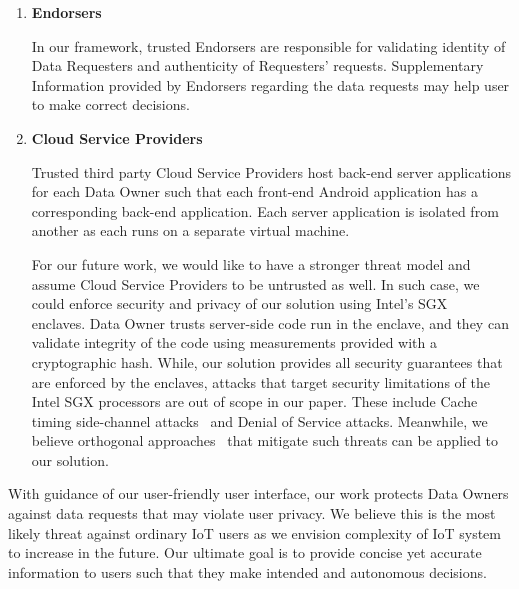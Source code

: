 \begin{enumerate}
\item \textbf {Endorsers}

In our framework, trusted Endorsers are responsible for validating identity of Data Requesters and authenticity of Requesters' requests. Supplementary Information provided by Endorsers regarding the data requests may help user to make correct decisions.

\item \textbf {Cloud Service Providers}

Trusted third party Cloud Service Providers host back-end server applications for each Data Owner such that each front-end Android application has a corresponding back-end application. Each server application is isolated from another as each runs on a separate virtual machine. 

For our future work, we would like to have a stronger threat model and assume Cloud Service Providers to be untrusted as well. In such case, we could enforce security and privacy of our solution using Intel's SGX~\cite{enclave} enclaves. Data Owner trusts server-side code run in the enclave, and they can validate integrity of the code using measurements provided with a cryptographic hash. While, our solution provides all security guarantees that are enforced by the enclaves, attacks that target security limitations of the Intel SGX processors are out of scope in our paper. These include Cache timing side-channel attacks~\cite{leaky} and Denial of Service attacks. Meanwhile, we believe orthogonal approaches~\cite{mengjia,raccoon} that mitigate such threats can be applied to our solution. 
\end{enumerate}

With guidance of our user-friendly user interface, our work protects Data Owners against data requests that may violate user privacy. We believe this is the most likely threat against ordinary IoT users as we envision complexity of IoT system to increase in the future. Our ultimate goal is to provide concise yet accurate information to users such that they make intended and autonomous decisions.